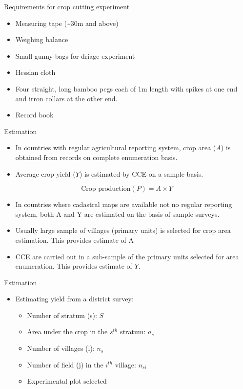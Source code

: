 \documentclass[11pt,dvipsnames,ignorenonframetext,aspectratio=169]{beamer}
\providecommand{\tightlist}{%
  \setlength{\itemsep}{0pt}\setlength{\parskip}{0pt}}
\begin{document}
\begin{frame}{Requirements for crop cutting experiment}
\protect\hypertarget{requirements-for-crop-cutting-experiment}{}
\begin{itemize}
\tightlist
\item
  Measuring tape (\textasciitilde30m and above)
\item
  Weighing balance
\item
  Small gunny bags for driage experiment
\item
  Hessian cloth
\item
  Four straight, long bamboo pegs each of 1m length with spikes at one
  end and irron collars at the other end.
\item
  Record book
\end{itemize}
\end{frame}

\begin{frame}{Estimation}
\protect\hypertarget{estimation}{}
\begin{itemize}
\tightlist
\item
  In countries with regular agricultural reporting system, crop area
  (\(A\)) is obtained from records on complete enumeration basis.
\item
  Average crop yield (\(Y\)) is estimated by CCE on a sample basis.
\end{itemize}

\[
\text{Crop production} (P) = A \times Y
\]

\begin{itemize}
\tightlist
\item
  In countries where cadastral maps are available not no regular
  reporting system, both A and Y are estimated on the basis of sample
  surveys.
\item
  Usually large sample of villages (primary units) is selected for crop
  area estimation. This provides estimate of A
\item
  CCE are carried out in a sub-sample of the primary units selected for
  area enumeration. This provides estimate of \(Y\).
\end{itemize}
\end{frame}

\begin{frame}{Estimation}
\protect\hypertarget{estimation-1}{}
\begin{itemize}
\tightlist
\item
  Estimating yield from a district survey:

  \begin{itemize}
  \tightlist
  \item
    Number of stratum (s): \(S\)
  \item
    Area under the crop in the \(s^{th}\) stratum: \(a_s\)
  \item
    Number of villages (i): \(n_s\)
  \item
    Number of field (j) in the \(i^{th}\) village: \(n_{si}\)
  \item
    Experimental plot selected
  \end{itemize}
\end{itemize}
\end{frame}
\end{document}
